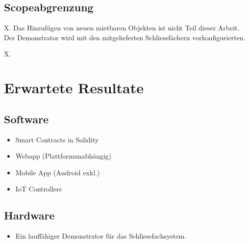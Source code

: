 \subsection{Scopeabgrenzung}
X. Das Hinzufügen von neuen mietbaren Objekten ist nicht Teil dieser Arbeit. Der Demonstrator wird mit den mitgelieferten Schliessfächern vorkonfigurierten.

X.

\section{Erwartete Resultate}
\label{sec:Erwartete_Resultate}

\subsection{Software}
\begin{itemize}
    \item Smart Contracts in Solidity
    \item Webapp (Plattformunabhängig)
    \item Mobile App (Android exkl.)
    \item IoT Controllers
\end{itemize}

\subsection{Hardware}
\begin{itemize}
    \item Ein lauffähiger Demonstrator für das Schliessfachsystem.
\end{itemize}
